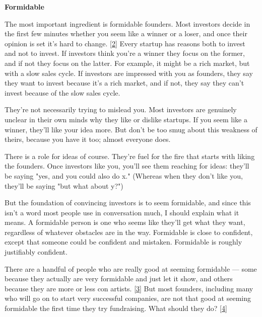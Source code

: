 \textbf{Formidable}

The
                    most important ingredient is formidable founders. Most
                    investors decide in the first few minutes whether you seem
                    like a winner or a loser, and once their opinion is set it's
                    hard to change. [\href{\#f2n}{2}]
                    Every startup has reasons both to invest and not to invest.
                    If investors think you're a winner they focus on the former,
                    and if not they focus on the latter. For example, it might
                    be a rich market, but with a slow sales cycle. If investors
                    are impressed with you as founders, they say they want to
                    invest because it's a rich market, and if not, they say they
                    can't invest because of the slow sales cycle.

They're
                    not necessarily trying to mislead you. Most investors are
                    genuinely unclear in their own minds why they like or
                    dislike startups. If you seem like a winner, they'll like
                    your idea more. But don't be too smug about this weakness of
                    theirs, because you have it too; almost everyone does.

There
                    is a role for ideas of course. They're fuel for the fire
                    that starts with liking the founders. Once investors like
                    you, you'll see them reaching for ideas: they'll be saying
                    "yes, and you could also do x." (Whereas when they don't
                    like you, they'll be saying "but what about y?")

But
                    the foundation of convincing investors is to seem
                    formidable, and since this isn't a word most people use in
                    conversation much, I should explain what it means. A
                    formidable person is one who seems like they'll get what
                    they want, regardless of whatever obstacles are in the way.
                    Formidable is close to confident, except that someone could
                    be confident and mistaken. Formidable is roughly justifiably
                    confident.

There are a handful of people who are
                    really good at seeming formidable --- some because they
                    actually are very formidable and just let it show, and
                    others because they are more or less con artists.
                    [\href{\#f3n}{3}]
                    But most founders, including many who will go on to start
                    very successful companies, are not that good at seeming
                    formidable the first time they try fundraising. What should
                    they do?
                    [\href{\#f4n}{4}]


